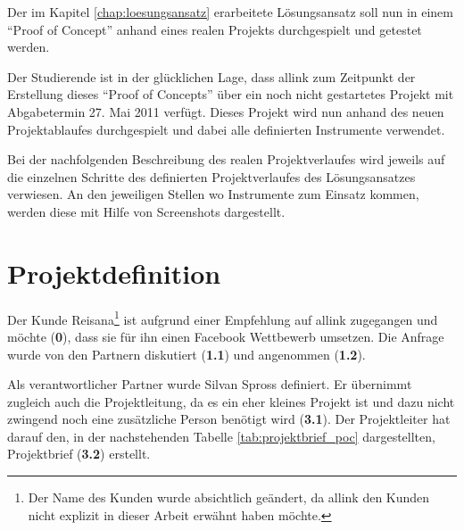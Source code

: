 Der im Kapitel \ref{chap:loesungsansatz} erarbeitete Lösungsansatz soll nun
in einem ``Proof of Concept'' anhand eines realen Projekts durchgespielt und getestet
werden.

Der Studierende ist in der glücklichen Lage, dass allink zum Zeitpunkt der
Erstellung dieses ``Proof of Concepts'' über ein noch nicht gestartetes Projekt 
mit Abgabetermin 27. Mai 2011 verfügt. Dieses Projekt wird nun anhand des neuen
Projektablaufes durchgespielt und dabei alle definierten Instrumente verwendet.

Bei der nachfolgenden Beschreibung des realen Projektverlaufes wird jeweils auf
die einzelnen Schritte des definierten Projektverlaufes des Lösungsansatzes
verwiesen. An den jeweiligen Stellen wo Instrumente zum Einsatz kommen, werden
diese mit Hilfe von Screenshots dargestellt.

\section{Projektdefinition}
Der Kunde Reisana\footnote{Der Name des Kunden wurde absichtlich geändert, da
allink den Kunden nicht explizit in dieser Arbeit erwähnt haben möchte.} ist aufgrund 
einer Empfehlung auf allink zugegangen und möchte (\textbf{0}), dass sie für ihn 
einen Facebook Wettbewerb umsetzen. Die Anfrage wurde von den Partnern diskutiert 
(\textbf{1.1}) und angenommen (\textbf{1.2}).

Als verantwortlicher Partner wurde Silvan Spross definiert. Er übernimmt
zugleich auch die Projektleitung, da es ein eher kleines Projekt ist und dazu
nicht zwingend noch eine zusätzliche Person benötigt wird (\textbf{3.1}). Der 
Projektleiter hat darauf den, in der nachstehenden Tabelle \ref{tab:projektbrief_poc} dargestellten,
Projektbrief (\textbf{3.2}) erstellt.


